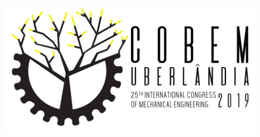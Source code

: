 \documentclass[xcolor=dvipsnames,8pt,aspectratio=34]{beamer}
\begin{document}
			\begin{frame}
\centering
{\includegraphics[trim={2.0 0.5 0.5 0.5}, angle=0, clip , scale=0.70]{fotos_formatacao_final/LOGO_COBEM_FINAL-Grande}}
			\end{frame}
		
		
		
		
\end{document}
